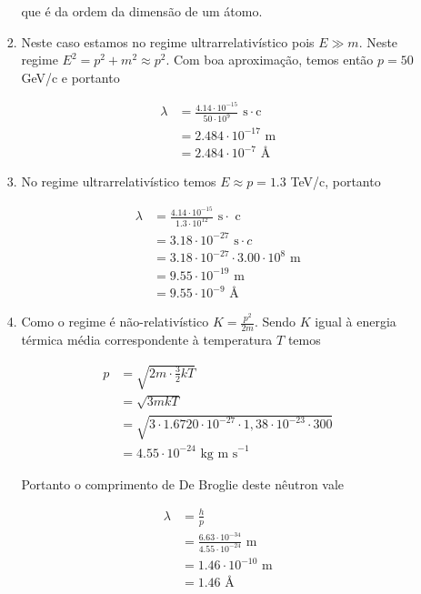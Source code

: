 \documentclass[a4paper, 12pt, notitlepage]{article}
\begin{document}
\begin{enumerate}
\begin{enumerate}
\begin{enumerate}
      \noindent que é da ordem da dimensão de um átomo.

    \item Neste caso estamos no regime ultrarrelativístico pois $E \gg m$. Neste regime $E^2 = p^2 + m^2 \approx p^2$. Com boa aproximação, temos então $p = 50$ GeV/c e portanto

      \begin{align*}
\lambda &= \frac{4.14 \cdot 10^{-15}}{50 \cdot 10^9} \text{ s}\cdot\text{c} \\
&= 2.484 \cdot 10^{-17} \text{ m} \\
&= 2.484 \cdot 10^{-7} \text{ \AA}
      \end{align*}

    \item No regime ultrarrelativístico temos $E \approx p = 1.3$ TeV/c, portanto

      \begin{align*}
\lambda &= \frac{4.14 \cdot 10^{-15}}{1.3 \cdot 10^{12}}\text{ s}\cdot \text{ c} \\
&= 3.18 \cdot 10^{-27} \text{ s}\cdot{ c} \\
&= 3.18 \cdot 10^{-27} \cdot 3.00 \cdot 10^8 \text{ m} \\
&= 9.55 \cdot 10^{-19} \text{ m} \\
&= 9.55 \cdot 10^{-9} \text{ \AA}
      \end{align*}

    \item Como o regime é não-relativístico $K = \frac{p^2}{2m}$. Sendo $K$ igual à energia térmica média correspondente à temperatura $T$ temos

      \begin{align*} 
p &= \sqrt{2m \cdot \frac{3}{2} kT}\\
&= \sqrt{3mkT}\\
&= \sqrt{3\cdot 1.6720 \cdot 10^{-27}\cdot 1,38 \cdot 10^{-23}\cdot 300}  \\
&= 4.55 \cdot 10^{-24} \text{ kg m s}^{-1}
      \end{align*}

      Portanto o comprimento de De Broglie deste nêutron vale

      \begin{align*}
\lambda &= \frac{h}{p} \\
&= \frac{6.63 \cdot 10^{-34}}{4.55 \cdot 10^{-24}}\text{ m} \\
&= 1.46 \cdot 10^{-10}\text{ m} \\
&= 1.46 \text{ \AA}
      \end{align*}
      

\end{enumerate}
\end{enumerate}
\end{enumerate}
\end{document}
